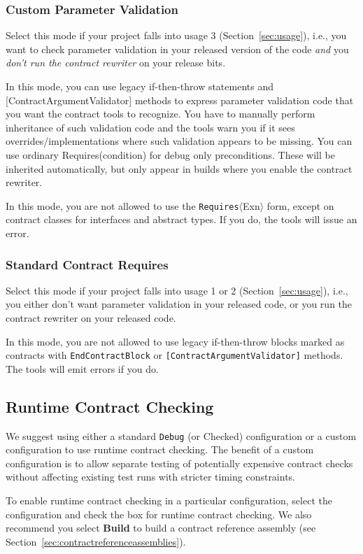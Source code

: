 \documentclass{article}
\newcommand{\code}[1]{\lstinline{#1}}
\newcommand{\requires}[1]{\code{Requires}$\langle$#1$\rangle$}
\begin{document}
\subsubsection{Custom Parameter Validation}
Select this mode if your project falls into usage 3
(Section~\ref{sec:usage}), i.e., you want to check parameter validation in your
released version of the code \emph{and} you \emph{don't run the
contract rewriter} on your release bits.

In this mode, you can use legacy if-then-throw statements and
\textsf{[ContractArgumentValidator]} methods to express parameter
validation code that you want the contract tools to recognize. 
You have to manually perform inheritance of such validation code and
the tools warn you if it sees overrides/implementations where such
validation appears to be missing.
You can use ordinary \textsf{Requires(condition)} for debug only
preconditions. These will be inherited automatically, but only appear
in builds where you enable the contract rewriter.

In this mode, you are not allowed to use the \requires{Exn} form,
except on contract classes for interfaces and abstract types. If you do,
the tools will issue an error.

\subsubsection{Standard Contract Requires}
Select this mode if your project falls into usage 1 or 2
(Section~\ref{sec:usage}), i.e., you either don't want parameter
validation in your released code, or you run the contract rewriter on
your released code.

In this mode, you are not allowed to use legacy if-then-throw blocks
marked as contracts with \code{EndContractBlock} or
\code{[ContractArgumentValidator]} methods. The tools will emit errors
if you do.

\subsection{Runtime Contract Checking}
We suggest using either a standard \code{Debug} (or Checked)
configuration or a custom configuration to use runtime contract
checking. The benefit of a custom configuration is to allow separate
testing of potentially expensive contract checks without affecting
existing test runs with stricter timing constraints.

To enable runtime contract checking in a particular configuration,
select the configuration and check the box for runtime contract
checking. We also recommend you select \textbf{Build} to build a contract reference assembly 
(see Section~\ref{sec:contractreferenceassemblies}).
\end{document}
